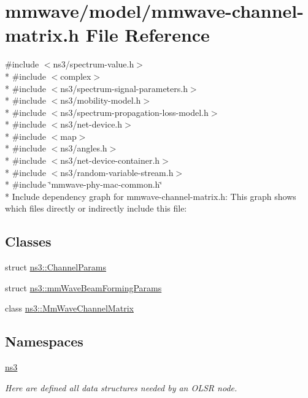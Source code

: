 \hypertarget{mmwave-channel-matrix_8h}{}\section{mmwave/model/mmwave-\/channel-\/matrix.h File Reference}
\label{mmwave-channel-matrix_8h}
{\ttfamily \#include $<$ns3/spectrum-\/value.\+h$>$}\\*
{\ttfamily \#include $<$complex$>$}\\*
{\ttfamily \#include $<$ns3/spectrum-\/signal-\/parameters.\+h$>$}\\*
{\ttfamily \#include $<$ns3/mobility-\/model.\+h$>$}\\*
{\ttfamily \#include $<$ns3/spectrum-\/propagation-\/loss-\/model.\+h$>$}\\*
{\ttfamily \#include $<$ns3/net-\/device.\+h$>$}\\*
{\ttfamily \#include $<$map$>$}\\*
{\ttfamily \#include $<$ns3/angles.\+h$>$}\\*
{\ttfamily \#include $<$ns3/net-\/device-\/container.\+h$>$}\\*
{\ttfamily \#include $<$ns3/random-\/variable-\/stream.\+h$>$}\\*
{\ttfamily \#include \char`\"{}mmwave-\/phy-\/mac-\/common.\+h\char`\"{}}\\*
Include dependency graph for mmwave-\/channel-\/matrix.h\+:
This graph shows which files directly or indirectly include this file\+:
\subsection*{Classes}
\begin{DoxyCompactItemize}
\item 
struct \hyperlink{structns3_1_1ChannelParams}{ns3\+::\+Channel\+Params}
\item 
struct \hyperlink{structns3_1_1mmWaveBeamFormingParams}{ns3\+::mm\+Wave\+Beam\+Forming\+Params}
\item 
class \hyperlink{classns3_1_1MmWaveChannelMatrix}{ns3\+::\+Mm\+Wave\+Channel\+Matrix}
\end{DoxyCompactItemize}
\subsection*{Namespaces}
\begin{DoxyCompactItemize}
\item 
 \hyperlink{namespacens3}{ns3}
\begin{DoxyCompactList}\small\item\em Here are defined all data structures needed by an O\+L\+SR node. \end{DoxyCompactList}\end{DoxyCompactItemize}
